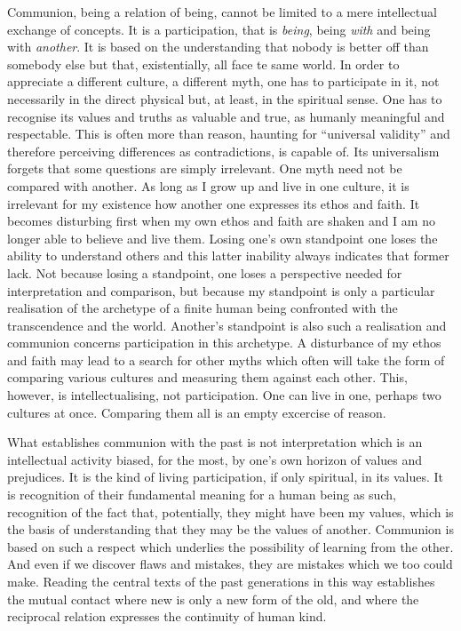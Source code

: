 Communion, being a relation of being, cannot be limited to a mere
intellectual exchange of concepts. It is a participation, that is {\em being},
being {\em with} and being with {\em another}. 
It is based on the understanding that nobody is better off than somebody else
but that, existentially, all face te same world.
In order to appreciate a different culture, a different myth,
one has to participate in it, not necessarily in the direct physical  but, at
least, in the spiritual sense. One has to recognise its values and truths as
valuable and true, as humanly meaningful and respectable. 
This is often more than      %
reason, haunting for
``universal validity'' and therefore perceiving differences as contradictions, 
is capable of. Its universalism forgets that some questions are simply 
irrelevant. One myth need not be compared with another.
As long as I grow up and live in one culture, it is irrelevant for my 
existence how another one expresses its
ethos and faith. It becomes disturbing first when my own ethos and faith are
shaken and I am no longer able to believe and live them. 
Losing one's own standpoint one loses the ability to understand others and this
latter inability always indicates that former lack. Not because losing a standpoint,
one loses a perspective needed for interpretation and comparison, but because my
standpoint is only a particular realisation of the archetype of a finite human being
confronted with the transcendence and the world. Another's standpoint is also such
a realisation and communion concerns participation in this archetype.
A disturbance of my ethos and faith may lead to
a search for other myths which often will take the form of comparing various
cultures and measuring them against each other. This, however, is 
intellectualising, not participation. One can live in one, perhaps two
cultures at once. Comparing them all is an empty excercise of reason.

What establishes communion with the past is not interpretation which is an
intellectual activity biased, for the most, by one's own horizon of values and
prejudices. It is the kind of living participation, if
only spiritual, in its values. It is recognition of their fundamental meaning
for a human being as such, recognition of the fact that, potentially, they 
might have been my values, which is the basis of understanding that they may 
be the values of another. 
Communion is based on such a respect  which underlies
 the possibility of learning from the other. And even if we discover flaws and
mistakes, they  are mistakes which we too could make.
Reading the central texts of the past 
generations in this way establishes the mutual contact where new is only a new
form of the old, and where the reciprocal relation expresses the continuity of
human kind. 


